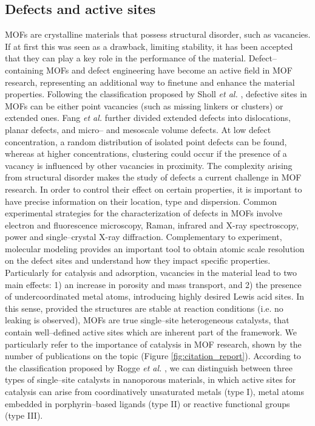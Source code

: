 \subsection*{Defects and active sites}
MOFs are crystalline materials that possess structural disorder, such as vacancies. If at first this was seen as a drawback, limiting stability, it has been accepted that they can play a key role in the performance of the material. Defect--containing MOFs and defect engineering have become an active field in MOF research, representing an additional way to finetune and enhance the material properties. 
Following the classification proposed by Sholl \textit{et al.} \cite{sholl2015defects}, defective sites in MOFs can be either point vacancies (such as missing linkers or clusters) or extended ones. Fang \textit{et al.} \cite{fang2015defect} further divided extended defects into dislocations, planar defects, and micro-- and mesoscale volume defects. 
\npar
At low defect concentration, a random distribution of isolated point defects can be found, whereas at higher concentrations, clustering could occur\cite{cliffe2014correlated} if the presence of a vacancy is influenced by other vacancies in proximity. The complexity arising from structural disorder makes the study of defects a current challenge in MOF research. In order to control their effect on certain properties, it is important to have precise information on their location, type and dispersion. Common experimental strategies for the characterization of defects in MOFs involve electron and fluorescence microscopy, Raman, infrared and X-ray spectroscopy, power and single--crystal X-ray diffraction\cite{fang2015defect}. Complementary to experiment, molecular modeling provides an important tool to obtain atomic scale resolution on the defect sites and understand how they impact specific properties.
%
\npar
Particularly for catalysis and adsorption, vacancies in the material lead to two main effects: 1) an increase in porosity and mass transport, and 2) the presence of undercoordinated metal atoms, introducing highly desired Lewis acid sites. 
In this sense, provided the structures are stable at reaction conditions (i.e. no leaking is observed), 
MOFs are true single--site heterogeneous catalysts, that contain well--defined active sites which are inherent part of the framework\cite{yang2019catalysis}. We particularly refer to the importance of catalysis in MOF research, shown by the number of publications on the topic (Figure \ref{fig:citation_report}). According to the classification proposed by Rogge \textit{et al.} \cite{rogge2017metal}, we can distinguish between three types of single--site catalysts in nanoporous materials, in which active sites for catalysis can arise from coordinatively unsaturated metals (type I), metal atoms embedded in porphyrin--based ligands (type II) or reactive functional groups (type III). 
